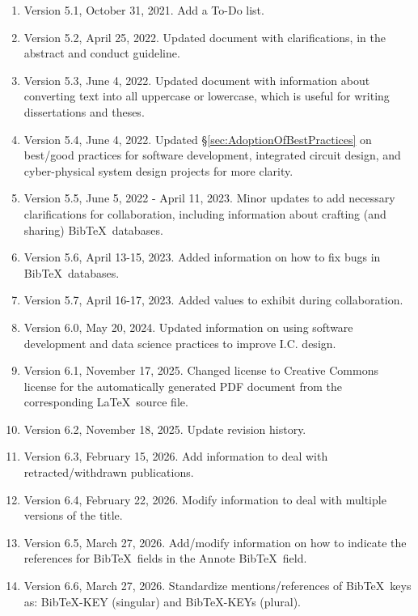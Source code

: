 \documentclass[letter,12pt]{article}
\begin{document}
\begin{enumerate}
\item Version 5.1, October 31, 2021. Add a To-Do list.
\item Version 5.2, April 25, 2022. Updated document with clarifications, in the abstract and conduct guideline.
\item Version 5.3, June 4, 2022. Updated document with information about converting text into all uppercase or lowercase, which is useful for writing dissertations and theses.
\item Version 5.4, June 4, 2022. Updated \S\ref{sec:AdoptionOfBestPractices} on best/good practices for software development, integrated circuit design, and cyber-physical system design projects for more clarity.
\item Version 5.5, June 5, 2022 - April 11, 2023. Minor updates to add necessary clarifications for collaboration, including information about crafting (and sharing) {\sc Bib}\TeX\ databases.
\item Version 5.6,  April 13-15, 2023. Added information on how to fix bugs in {\sc Bib}\TeX\ databases.
\item Version 5.7,  April 16-17, 2023. Added values to exhibit during collaboration.
\item Version 6.0, May 20, 2024. Updated information on using software development and data science practices to improve I.C. design.
\item Version 6.1, November 17, 2025. Changed license to Creative Commons license for the automatically generated PDF document from the corresponding \LaTeX\ source file.
\item Version 6.2, November 18, 2025. Update revision history.
\item Version 6.3, February 15, 2026. Add information to deal with retracted/withdrawn publications.
\item Version 6.4, February 22, 2026. Modify information to deal with multiple versions of the title.
\item Version 6.5, March 27, 2026. Add/modify information on how to indicate the references for {\sc Bib}\TeX\ fields in the Annote {\sc Bib}\TeX\ field.
\item Version 6.6, March 27, 2026. Standardize mentions/references of {\sc Bib}\TeX\ keys as: BibTeX-KEY (singular) and BibTeX-KEYs (plural).
\end{enumerate}








\end{document}
